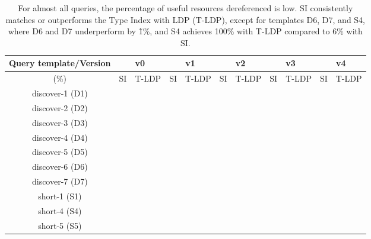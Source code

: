 \begin{table}[htbp]
	\begin{center}
		\begin{tabular}{|c|c|c|c|c|c|c|c|c|c|c|}
			\hline
            \multicolumn{1}{|c}{Query template/Version} & \multicolumn{2}{|c|}{v0} & \multicolumn{2}{|c|}{v1} & \multicolumn{2}{|c|}{v2} & \multicolumn{2}{|c|}{v3} & \multicolumn{2}{|c|}{v4} \\
			\hline
            (\%) & SI  & T-LDP & SI & T-LDP & SI & T-LDP& SI & T-LDP & SI & T-LDP \\
            \hline
			discover-1 (D1) & {} & {} & {} & {} & {} & {} & {} & {} & {} & {} \\
            \hline
            discover-2 (D2) & {} & {} & {} & {} & {} & {} & {} & {} & {} & {} \\
			\hline
            discover-3 (D3) & {} & {} & {} & {} & {} & {} & {} & {} & {} & {} \\
			\hline
            discover-4 (D4) & {} & {} & {} & {} & {} & {} & {} & {} & {} & {} \\
			\hline
            discover-5 (D5) & {} & {} & {} & {} & {} & {} & {} & {} & {} & {} \\
			\hline
            discover-6 (D6) & {} & {} & {} & {} & {} & {} & {} & {} & {} & {} \\
			\hline
            discover-7 (D7) & {} & {} & {} & {} & {} & {} & {} & {} & {} & {} \\
			\hline
            short-1 (S1) & {} & {} & {} & {} & {} & {} & {} & {} & {} & {} \\
			\hline
            short-4 (S4) & {} & {} & {} & {} & {} & {} & {} & {} & {} & {} \\
			\hline
            short-5 (S5) & {} & {} & {} & {} & {} & {} & {} & {} & {} & {} \\
			\hline
		\end{tabular}
	\end{center}
	\caption{
        For almost all queries, the percentage of useful resources dereferenced is low. 
		SI consistently matches or outperforms the Type Index with LDP (T-LDP), except for templates D6, D7, and S4, where D6 and D7 underperform by \~1\%, and S4 achieves 100\% with T-LDP compared to 6\% with SI.
		}
	\label{tab:ratioUsefulResources}
\end{table}
